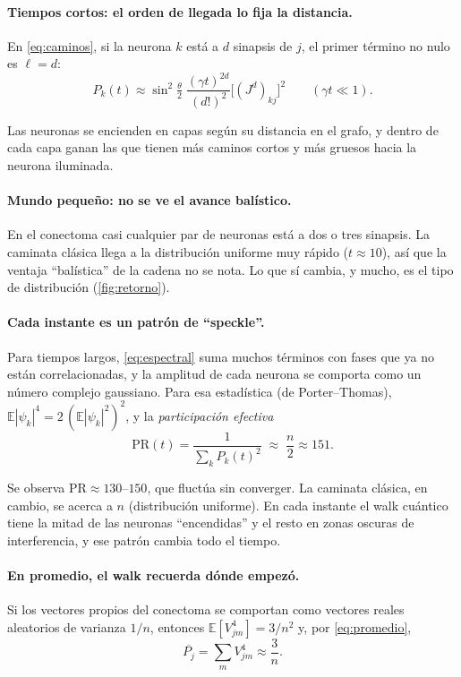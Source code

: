 \documentclass[11pt,a4paper]{article}
\theoremstyle{plain}
\theoremstyle{definition}
\theoremstyle{remark}
\begin{document}
\paragraph{Tiempos cortos: el orden de llegada lo fija la distancia.} En \eqref{eq:caminos}, si la neurona $k$ está a $d$ sinapsis de $j$, el primer término no nulo es $\ell=d$:
\begin{equation}
P_k(t)\approx\sin^2\!\tfrac\theta2\;\frac{(\gamma t)^{2d}}{(d!)^2}\bigl[(J^d)_{kj}\bigr]^2
\qquad(\gamma t\ll1).
\end{equation}

Las neuronas se encienden en capas según su distancia en el grafo, y dentro de cada capa ganan las que tienen más caminos cortos y más gruesos hacia la neurona iluminada.

\paragraph{Mundo pequeño: no se ve el avance balístico.} En el conectoma casi cualquier par de neuronas está a dos o tres sinapsis. La caminata clásica llega a la distribución uniforme muy rápido ($t\approx10$), así que la ventaja ``balística'' de la cadena no se nota. Lo que sí cambia, y mucho, es el tipo de distribución (\cref{fig:retorno}).

\paragraph{Cada instante es un patrón de ``speckle''.} Para tiempos largos, \eqref{eq:espectral} suma muchos términos con fases que ya no están correlacionadas, y la amplitud de cada neurona se comporta como un número complejo gaussiano. Para esa estadística (de Porter--Thomas), $\mathbb E|\psi_k|^4=2\,(\mathbb E|\psi_k|^2)^2$, y la \emph{participación efectiva}
\begin{equation}
\mathrm{PR}(t)=\frac{1}{\sum_kP_k(t)^2}\;\approx\;\frac n2\approx151 .
\end{equation}

Se observa $\mathrm{PR}\approx130$--$150$, que fluctúa sin converger. La caminata clásica, en cambio, se acerca a $n$ (distribución uniforme). En cada instante el walk cuántico tiene la mitad de las neuronas ``encendidas'' y el resto en zonas oscuras de interferencia, y ese patrón cambia todo el tiempo.

\paragraph{En promedio, el walk recuerda dónde empezó.} Si los vectores propios del conectoma se comportan como vectores reales aleatorios de varianza $1/n$, entonces $\mathbb E[V_{jm}^4]=3/n^2$ y, por \eqref{eq:promedio},
\begin{equation}
\overline{P_j}=\sum_mV_{jm}^4\approx\frac3n .
\end{equation}
\end{document}
